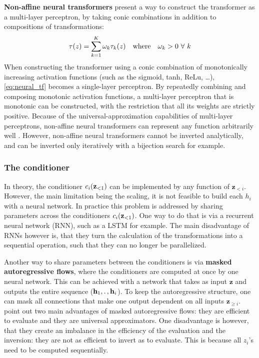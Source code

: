 \documentclass[english]{scrartcl}
\begin{document}
    \textbf{Non-affine neural transformers} present a way to construct the transformer as a multi-layer perceptron, by taking conic combinations in addition to compositions of transformations:
    \begin{equation}
        \label{eq:neural_tf}
        \tau (z) = \sum _{k=1} ^{K} \omega_k \tau _k(z) \quad \text{where} \quad\omega_k > 0\ \forall\ k
    \end{equation}
    When constructing the transformer using a conic combination of monotonically increasing activation functions (such as the sigmoid, tanh, ReLu, \ldots), \cref{eq:neural_tf} becomes a single-layer perceptron.
    By repeatedly combining and composing monotonic activation functions, a multi-layer perceptron that is monotonic can be constructed, with the restriction that all its weights are strictly positive.
    Because of the universal-approximation capabilities of multi-layer perceptrons, non-affine neural transformers can represent any function arbitrarily well \parencite{huang_neural_2018}.
    However, non-affine neural transformers cannot be inverted analytically, and can be inverted only iteratively with a bijection search for example.

    \subsubsection{The conditioner} \label{subsec:conditioner}
    In theory, the conditioner $c_i(\textbf{z}_{<1})$ can be implemented by any function of $\textbf{z}_{<i}$.
    However, the main limitation being the scaling, it is not feasible to build each $h_i$ with a neural network.
    In practice this problem is addressed by sharing parameters across the conditioners $c_i(\textbf{z}_{<1})$.
    One way to do that is via a recurrent neural network (RNN), such as a LSTM \parencite{hochreiter_long_1997} for example.
    The main disadvantage of RNNs however is, that they turn the calculation of the transformations into a sequential operation, such that they can no longer be parallelized.

    Another way to share parameters between the conditioners is via \textbf{masked autoregressive flows}, where the conditioners are computed at once by one neural network.
    This can be achieved with a network that takes as input $\textbf{z}$ and outputs the entire sequence ($\textbf{h}_1, \ldotp, \textbf{h}_i$).
    To keep the autoregressive structure, one can mask all connections that make one output dependent on all inputs $\textbf{z}_{\geq i}$.
    \Cite{papamakarios_normalizing_2019} point out two main advantages of masked autoregressive flows: they are efficient to evaluate and they are universal approximators.
    One disadvantage is however, that they create an imbalance in the efficiency of the evaluation and the inversion: they are not as efficient to invert as to evaluate.
    This is because all $z_i$'s need to be computed sequentially.
\end{document}
